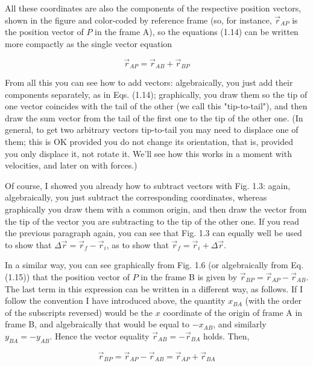\documentclass[10pt]{article}
\begin{document}
All these coordinates are also the components of the respective position vectors, shown in the figure and color-coded by reference frame (so, for instance, $\vec{r}_{A P}$ is the position vector of $P$ in the frame A), so the equations (1.14) can be written more compactly as the single vector equation


\begin{equation*}
\vec{r}_{A P}=\vec{r}_{A B}+\vec{r}_{B P} \tag{1.15}
\end{equation*}


From all this you can see how to add vectors: algebraically, you just add their components separately, as in Eqs. (1.14); graphically, you draw them so the tip of one vector coincides with the tail of the other (we call this "tip-to-tail"), and then draw the sum vector from the tail of the first one to the tip of the other one. (In general, to get two arbitrary vectors tip-to-tail you may need to displace one of them; this is OK provided you do not change its orientation, that is, provided you only displace it, not rotate it. We'll see how this works in a moment with velocities, and later on with forces.)

Of course, I showed you already how to subtract vectors with Fig. 1.3: again, algebraically, you just subtract the corresponding coordinates, whereas graphically you draw them with a common origin, and then draw the vector from the tip of the vector you are subtracting to the tip of the other one. If you read the previous paragraph again, you can see that Fig. 1.3 can equally well be used to show that $\Delta \vec{r}=\vec{r}_{f}-\vec{r}_{i}$, as to show that $\vec{r}_{f}=\vec{r}_{i}+\Delta \vec{r}$.

In a similar way, you can see graphically from Fig. 1.6 (or algebraically from Eq. (1.15)) that the position vector of $P$ in the frame B is given by $\vec{r}_{B P}=\vec{r}_{A P}-\vec{r}_{A B}$. The last term in this expression can be written in a different way, as follows. If I follow the convention I have introduced above, the quantity $x_{B A}$ (with the order of the subscripts reversed) would be the $x$ coordinate of the origin of frame A in frame B, and algebraically that would be equal to $-x_{A B}$, and similarly $y_{B A}=-y_{A B}$. Hence the vector equality $\vec{r}_{A B}=-\vec{r}_{B A}$ holds. Then,


\begin{equation*}
\vec{r}_{B P}=\vec{r}_{A P}-\vec{r}_{A B}=\vec{r}_{A P}+\vec{r}_{B A} \tag{1.16}
\end{equation*}
\end{document}

